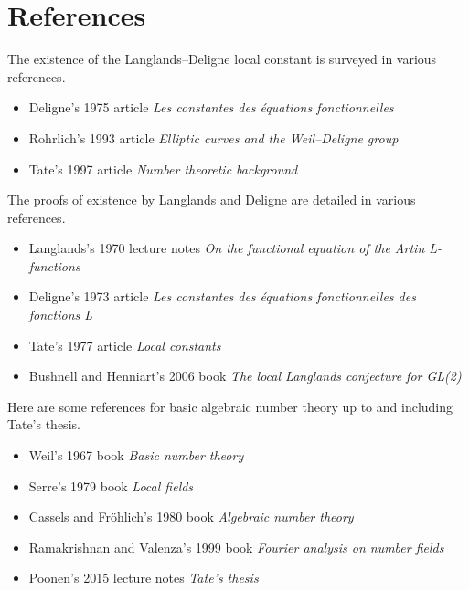 \section{References}

The existence of the Langlands--Deligne local constant is surveyed in various references.
\begin{itemize}
\item[Del75] Deligne's 1975 article \emph{Les constantes des \'equations fonctionnelles}
\item[Roh93] Rohrlich's 1993 article \emph{Elliptic curves and the Weil--Deligne group}
\item[Tat97] Tate's 1997 article \emph{Number theoretic background}
\end{itemize}
The proofs of existence by Langlands and Deligne are detailed in various references.
\begin{itemize}
\item[Lan70] Langlands's 1970 lecture notes \emph{On the functional equation of the Artin L-functions}
\item[Del73] Deligne's 1973 article \emph{Les constantes des \'equations fonctionnelles des fonctions L}
\item[Tat77] Tate's 1977 article \emph{Local constants}
\item[BH06] Bushnell and Henniart's 2006 book \emph{The local Langlands conjecture for GL(2)}
\end{itemize}
Here are some references for basic algebraic number theory up to and including Tate's thesis.
\begin{itemize}
\item[Wei67] Weil's 1967 book \emph{Basic number theory}
\item[Ser79] Serre's 1979 book \emph{Local fields}
\item[CF80] Cassels and Fr\"ohlich's 1980 book \emph{Algebraic number theory}
\item[RV99] Ramakrishnan and Valenza's 1999 book \emph{Fourier analysis on number fields}
\item[Poo15] Poonen's 2015 lecture notes \emph{Tate's thesis}
\end{itemize}

